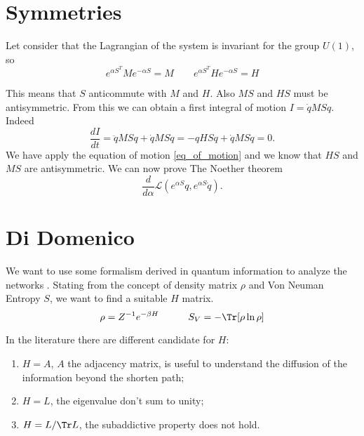 \section{Symmetries}
Let consider that the Lagrangian of the system is invariant for the group $U(1)$, so
\begin{equation}
    e^{\alpha S^T}Me^{-\alpha S}= M \qquad e^{\alpha S^T}He^{-\alpha S}= H
\end{equation}

This means that $S$ anticommute with $M$ and $H$. Also $MS$ and $HS$ must be antisymmetric.
From this we can obtain a first integral of motion $I= \dot qMSq$. Indeed
\begin{equation}
    \frac{dI}{dt} = \ddot qMSq + \dot qMS \dot q = -qHSq  + \dot q MS \dot q = 0.
\end{equation}
We have apply the equation of motion \ref{eq_of_motion} and we know that $HS$ and $MS$ are antisymmetric. We can now prove The Noether theorem
\begin{equation}
    \frac{d}{d\alpha}\mathcal{L}(e^{\alpha S}q,e^{\alpha S}\dot q).
\end{equation}


\section{Di Domenico}

We want to use some formalism derived in quantum information to analyze the networks \cite{De_Domenico_2016}. Stating from the concept of density matrix $\rho$ and Von Neuman Entropy $S$, we want to find a suitable $H$ matrix.
\begin{equation}
    \rho = Z^{-1} e^{-\beta H} \qquad \quad S_V = -\Tr[\rho \ln \rho] 
\end{equation}

In the literature there are different candidate for $H$:
\begin{enumerate}
    \item $H = A$, $A$ the adjacency matrix, is useful to understand the diffusion of the information beyond the shorten path;
    \item $H= L$, the eigenvalue don't sum to unity;
    \item $H = L/\Tr L$, the subaddictive property does not hold. 
\end{enumerate}

